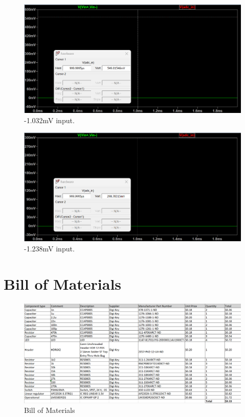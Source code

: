 \begin{figure}[h]
\centering
\includegraphics[width=\textwidth]{proposal/parts/-1.032mV.png}
\caption{-1.032mV input.}
\end{figure}

\begin{figure}[h]
\centering
\includegraphics[width=\textwidth]{proposal/parts/-1.238mV.png}
\caption{-1.238mV input.}
\end{figure}

\chapter{Bill of Materials}

\begin{figure}[h]
\centering
\includegraphics[width=\textwidth]{proposal/parts/BOM.png}
\caption{Bill of Materials}
\end{figure}

